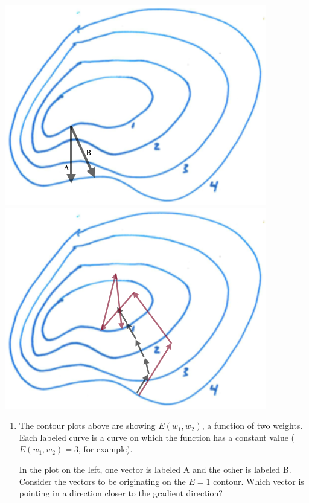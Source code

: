 \documentclass[12pt,letterpaper,noanswers]{exam}
\begin{document}
{\includegraphics[scale=0.5]{img/C23gradient.png}
\includegraphics[scale=0.5]{img/C23gradientpath.png}
}
\begin{enumerate}[resume=classQ]
    \item The contour plots above are showing $E(w_1,w_2)$, a function of two weights.  Each labeled curve is a curve on which the function has a constant value ($E(w_1,w_2) = 3$, for example).
   
   In the plot on the left, one vector is labeled A and the other is labeled B.  Consider the vectors to be originating on the $E = 1$ contour.  Which vector is pointing in a direction closer to the gradient direction?
    \vspace{1cm}
   
\end{enumerate}
\end{document}
